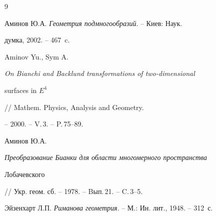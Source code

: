 \begin{thebibliography}{9}







Аминов Ю.А. {\em Геометрия подмногообразий}. -- Киев: Наук.


думка, 2002. -- 467~c.




Aminov Yu., Sym A. {\em On Bianchi and Backlund transformations of two-dimensional 


surfaces in $E^4$} // Mathem. Physics, Analysis and Geometry.


-- 2000. -- V.\,3. -- P.\,75--89.




Аминов Ю.А. {\em Преобразование Бианки для области многомерного пространства


Лобачевского} // Укр. геом. сб. -- 1978. -- Bып.\,21. -- C.\,3--5.




Эйзенхарт Л.П. {\em Риманова геометрия}. -- М.: Ин. лит., 1948. -- 312~с.





\end{thebibliography}





\vskip 2cm












\label{end}





